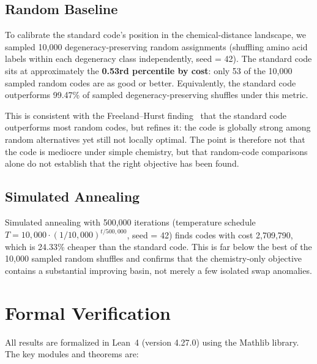 \documentclass[11pt,twocolumn]{article}
\begin{document}
\subsection{Random Baseline}

To calibrate the standard code's position in the chemical-distance
landscape, we sampled 10,000 degeneracy-preserving random assignments
(shuffling amino acid labels within each degeneracy class independently,
seed = 42). The standard code sits at approximately the \textbf{0.53rd
percentile by cost}: only 53 of the 10,000 sampled random codes are as good
or better. Equivalently, the standard code outperforms 99.47\% of sampled
degeneracy-preserving shuffles under this metric.

This is consistent with the Freeland--Hurst finding~\citep{FreelandHurst1998}
that the standard code outperforms most random codes, but refines it: the
code is globally strong among random alternatives yet still not locally
optimal. The point is therefore not that the code is mediocre under simple
chemistry, but that random-code comparisons alone do not establish that the
right objective has been found.

\subsection{Simulated Annealing}

Simulated annealing with 500,000 iterations (temperature schedule
$T = 10{,}000 \cdot (1/10{,}000)^{t/500{,}000}$, seed = 42) finds codes
with cost 2,709,790, which is 24.33\% cheaper than the standard code.
This is far below the best of the 10,000 sampled random shuffles and
confirms that the chemistry-only objective contains a substantial improving
basin, not merely a few isolated swap anomalies.

\section{Formal Verification}

All results are formalized in Lean~4 (version 4.27.0) using the Mathlib
library. The key modules and theorems are:
\end{document}
